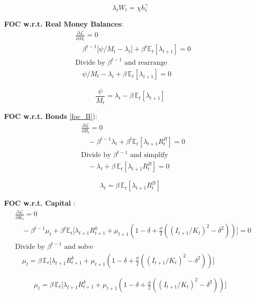 \documentclass[11pt,preprint]{elsarticle}
\numberwithin{equation}{section}
\numberwithin{figure}{section}
\numberwithin{table}{section}
\begin{document}
\begin{equation}\label{foc_h}
\boxed{\lambda_t W_t = \chi h_t^{\gamma}}
\end{equation}

\textbf{FOC w.r.t. Real Money Balances}: \begin{align*}
  & \frac{\partial \mathcal{L}}{\partial M_t} = 0 \\
  & \quad \beta^{t-1}\bigl[\psi/M_t - \lambda_t\bigr] + \beta^t\mathbb{E}_t[\lambda_{t+1}] = 0 \\[6pt]
  & \text{Divide by }\beta^{t-1}\text{ and rearrange} \\
  & \quad \psi/M_t - \lambda_t + \beta\,\mathbb{E}_t[\lambda_{t+1}] = 0
\end{align*}

\begin{equation}\label{foc_M}
\boxed{\frac{\psi}{M_t} = \lambda_t - \beta\,\mathbb{E}_t[\lambda_{t+1}]}
\end{equation}

\textbf{FOC w.r.t. Bonds} \eqref{foc_B}): \begin{align*}
  & \frac{\partial \mathcal{L}}{\partial B_t} = 0 \\
  & \quad -\beta^{t-1}\lambda_t + \beta^t\mathbb{E}_t[\lambda_{t+1}R^B_t] = 0 \\[6pt]
  & \text{Divide by }\beta^{t-1}\text{ and simplify} \\
  & \quad -\lambda_t + \beta\,\mathbb{E}_t[\lambda_{t+1}R^B_t] = 0
\end{align*}

\begin{equation}\label{foc_B}
\boxed{\lambda_t = \beta\,\mathbb{E}_t[\lambda_{t+1}R^B_t]}
\end{equation}

\textbf{FOC w.r.t. Capital} : \begin{align*}
  & \frac{\partial \mathcal{L}}{\partial K_t} = 0 \\
  & \quad -\beta^{t-1}\mu_t + \beta^t\mathbb{E}_t\bigl[\lambda_{t+1}R^k_{t+1} + \mu_{t+1}(1-\delta + \tfrac{\phi}{2}((I_{t+1}/K_t)^2 - \delta^2))\bigr] = 0 \\[6pt]
  & \text{Divide by }\beta^{t-1}\text{ and solve} \\
  & \quad \mu_t = \beta\,\mathbb{E}_t\bigl[\lambda_{t+1}R^k_{t+1} + \mu_{t+1}(1-\delta + \tfrac{\phi}{2}((I_{t+1}/K_t)^2 - \delta^2))\bigr]
\end{align*}

\begin{equation}\label{foc_K}
\boxed{\mu_t = \beta\,\mathbb{E}_t\bigl[\lambda_{t+1}R^k_{t+1} + \mu_{t+1}(1-\delta + \tfrac{\phi}{2}((I_{t+1}/K_t)^2 - \delta^2))\bigr]}
\end{equation}
\end{document}
